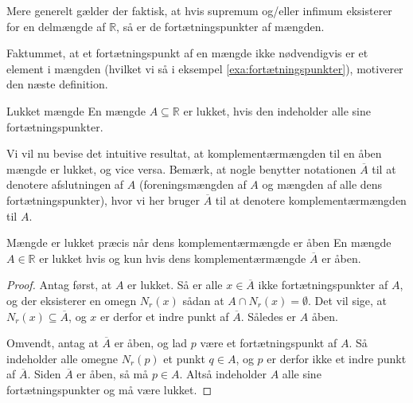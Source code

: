 Mere generelt gælder der faktisk, at hvis supremum og/eller infimum eksisterer for en delmængde af $\mathbb{R}$, så er de fortætningspunkter af mængden.

Faktummet, at et fortætningspunkt af en mængde ikke nødvendigvis er et element i mængden (hvilket vi så i eksempel \ref{exa:fortætningspunkter}), motiverer den næste definition.

\begin{definition}[label=def:lukket]{Lukket mængde }{}
  En mængde $A \subseteq \mathbb{R}$ er lukket, hvis den indeholder alle sine fortætningspunkter. 
\end{definition}

Vi vil nu bevise det intuitive resultat, at komplementærmængden til en åben mængde er lukket, og vice versa.
Bemærk, at nogle benytter notationen $\overline A$ til at denotere afslutningen af $A$ (foreningsmængden af $A$ og mængden af alle dens fortætningspunkter), hvor vi her bruger $\overline A$ til at denotere komplementærmængden til $A$.

\begin{theorem}[label=theo:åben_lukket_komp]{Mængde er lukket præcis når dens komplementærmængde er åben}{}
  En mængde $A \in \mathbb{R}$ er lukket hvis og kun hvis dens komplementærmængde $\overline A$ er åben. 
\end{theorem}
\begin{proof} 
  Antag først, at $A$ er lukket.
  Så er alle $x \in \overline A$ ikke fortætningspunkter af $A$, og der eksisterer en omegn $N_r(x)$ sådan at $A \cap N_r(x)=\emptyset$. 
  Det vil sige, at $N_r(x) \subseteq \overline A$, og $x$ er derfor et indre punkt af $\overline A$.
  Således er $A$ åben. 

  Omvendt, antag at $\overline A$ er åben, og lad $p$ være et fortætningspunkt af $A$. 
  Så indeholder alle omegne $N_r(p)$ et punkt $q \in A$, og $p$ er derfor ikke et indre punkt af $\overline A$.
  Siden $\overline A$ er åben, så må $p \in A$.
  Altså indeholder $A$ alle sine fortætningspunkter og må være lukket. 
\end{proof}

